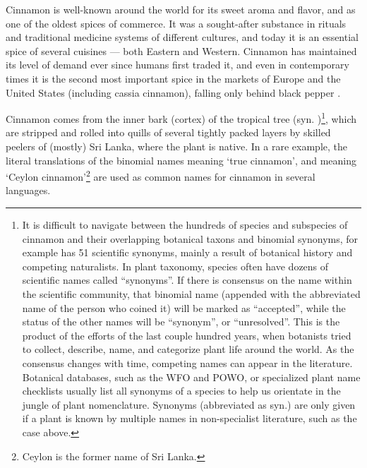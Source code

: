 Cinnamon is well-known around the world for its sweet aroma and flavor, and as one of the oldest spices of commerce. It was a sought-after substance in rituals and traditional medicine systems of different cultures, and today it is an essential spice of several cuisines --- both Eastern and Western. Cinnamon has maintained its level of demand ever since humans first traded it, and even in contemporary times it is the second most important spice in the markets of Europe and the United States (including cassia cinnamon), falling only behind black pepper \parencite[]{ravindran_cinnamon_2004}.

Cinnamon comes from the inner bark (cortex) of the tropical tree  (syn. )\footnote{It is difficult to navigate between the hundreds of species and subspecies of cinnamon and their overlapping botanical taxons and binomial synonyms,  for example has 51 scientific synonyms, mainly a result of botanical history and competing naturalists. In plant taxonomy, species often have dozens of scientific names called ``synonyms''. If there is consensus on the name within the scientific community, that binomial name (appended with the abbreviated name of the person who coined it) will be marked as ``accepted'', while the status of the other names will be ``synonym'', or ``unresolved''. This is the product of the efforts of the last couple hundred years, when botanists tried to collect, describe, name, and categorize plant life around the world. As the consensus changes with time, competing names can appear in the literature. Botanical databases, such as the \gls{WFO} and \gls{POWO}, or specialized plant name checklists usually list all synonyms of a species to help us orientate in the jungle of plant nomenclature. Synonyms (abbreviated as syn.) are only given if a plant is known by multiple names in non-specialist literature, such as the case above.}, which are stripped and rolled into quills of several tightly packed layers by skilled peelers of (mostly) Sri Lanka, where the plant is native. In a rare example, the literal translations of the binomial names  meaning `true cinnamon', and  meaning `Ceylon cinnamon'\footnote{Ceylon is the former name of Sri Lanka.} are used as common names for cinnamon in several languages. 



